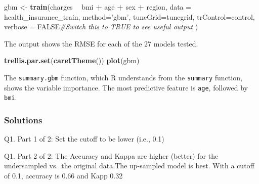\documentclass[]{book}
\newenvironment{Shaded}{\begin{snugshade}}{\end{snugshade}}
\newcommand{\CommentTok}[1]{\textcolor[rgb]{0.56,0.35,0.01}{\textit{#1}}}
\newcommand{\DataTypeTok}[1]{\textcolor[rgb]{0.13,0.29,0.53}{#1}}
\newcommand{\KeywordTok}[1]{\textcolor[rgb]{0.13,0.29,0.53}{\textbf{#1}}}
\newcommand{\NormalTok}[1]{#1}
\newcommand{\OperatorTok}[1]{\textcolor[rgb]{0.81,0.36,0.00}{\textbf{#1}}}
\newcommand{\StringTok}[1]{\textcolor[rgb]{0.31,0.60,0.02}{#1}}
\begin{document}
\begin{Shaded}
\begin{Highlighting}[]
\NormalTok{gbm <-}\StringTok{ }\KeywordTok{train}\NormalTok{(charges }\OperatorTok{~}\StringTok{ }\NormalTok{bmi }\OperatorTok{+}\StringTok{ }\NormalTok{age }\OperatorTok{+}\StringTok{ }\NormalTok{sex }\OperatorTok{+}\StringTok{ }\NormalTok{region,}
            \DataTypeTok{data =}\NormalTok{ health_insurance_train,}
            \DataTypeTok{method=}\StringTok{'gbm'}\NormalTok{, }
            \DataTypeTok{tuneGrid=}\NormalTok{tunegrid, }
            \DataTypeTok{trControl=}\NormalTok{control,}
            \DataTypeTok{verbose =}\NormalTok{ FALSE}\CommentTok{#Switch this to TRUE to see useful output}
\NormalTok{            )}
\end{Highlighting}
\end{Shaded}

The output shows the RMSE for each of the 27 models tested.

\begin{Shaded}
\begin{Highlighting}[]
\KeywordTok{trellis.par.set}\NormalTok{(}\KeywordTok{caretTheme}\NormalTok{())}
\KeywordTok{plot}\NormalTok{(gbm)}
\end{Highlighting}
\end{Shaded}

The \texttt{summary.gbm} function, which R understands from the \texttt{summary} function, shows the variable importance. The most predictive feature is \texttt{age}, followed by \texttt{bmi}.

\begin{Shaded}
\end{Shaded}

\hypertarget{solutions}{%
\subsubsection{Solutions}\label{solutions}}

Q1. Part 1 of 2: Set the cutoff to be lower (i.e., 0.1)

Q1. Part 2 of 2: The Accuracy and Kappa are higher (better) for the undersampled vs.~the original data.The up-sampled model is best. With a cutoff of 0.1, accuracy is 0.66 and Kapp 0.32
\end{document}
